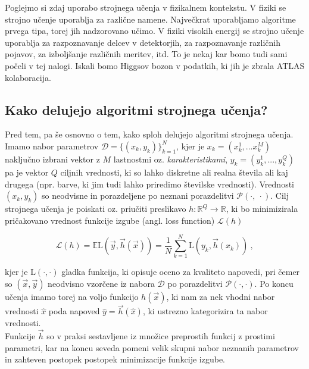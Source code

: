 \documentclass[a4paper]{article}
\begin{document}
Poglejmo si zdaj uporabo strojnega učenja v fizikalnem kontekstu. V fiziki se strojno učenje uporablja za različne
namene. Največkrat uporabljamo algoritme prvega tipa, torej jih nadzorovano učimo. V fiziki visokih energij se strojno
učenje uporablja za razpoznavanje delcev v detektorjih, za razpoznavanje različnih pojavov, za izboljšanje različnih 
meritev, itd. To je nekaj kar bomo tudi sami počeli v tej nalogi. Iskali bomo Higgsov bozon v podatkih, ki jih je
zbrala ATLAS kolaboracija. \\

\subsection{Kako delujejo algoritmi strojnega učenja?}
Pred tem, pa še osnovno o tem, kako sploh delujejo algoritmi strojnega učenja. Imamo nabor parametrov $\mathcal{D} = 
\{(x_k, y_k)\}_{k=1}^N$, kjer je $x_k = (x_k^1,...x_k^M)$ naključno izbrani vektor z $M$ lastnostmi oz. 
\textit{karakteristikami}, $y_k = (y_k^1,...,y_k^Q)$  pa je vektor $Q$ ciljnih vrednosti, ki so lahko diskretne ali
realna števila ali kaj drugega (npr. barve, ki jim tudi lahko priredimo številske vrednosti). Vrednosti $(x_k, y_k)$
so neodvisne in porazdeljene po neznani porazdelitvi $\mathcal{P}(\cdot,\>\cdot)$. Cilj strojnega učenja je poiskati
oz. priučiti preslikavo $h: \mathbb{R}^Q \rightarrow \mathbb{R}$, ki bo minimizirala pričakovano vrednost funkcije 
izgube (angl. loss function) $\mathcal{L}(h)$

\begin{equation}
    \mathcal{L}(h) = \mathbb{E}\mathrm{L}(\vec{y}, \vec{h}(\vec{x})) = \frac{1}{N} \sum_{k=1}^N{\mathrm{L}(y_k, \vec{h}(x_k))}\>,
\end{equation}

kjer je $\mathrm{L}(\cdot,\cdot)$ gladka funkcija, ki opisuje oceno za kvaliteto napovedi, pri čemer so $(\vec{x}, \vec{y})$
neodvisno vzorčene iz nabora $\mathcal{D}$ po porazdelitvi $\mathcal{P}(\cdot,\cdot)$. Po koncu učenja imamo torej na voljo 
funkcijo $h(\vec{x})$, ki nam za nek vhodni nabor vrednosti $\hat{x}$ poda napoved $\hat{y} = \vec{h}(\hat{x})$, ki ustrezno
kategorizira ta nabor vrednosti.\\

Funkcije $\vec{h}$ so v praksi sestavljene iz množice preprostih funkcij z prostimi parametri, kar na koncu seveda pomeni 
velik skupni nabor neznanih parametrov in zahteven postopek postopek minimizacije funkcije izgube.
\end{document}
